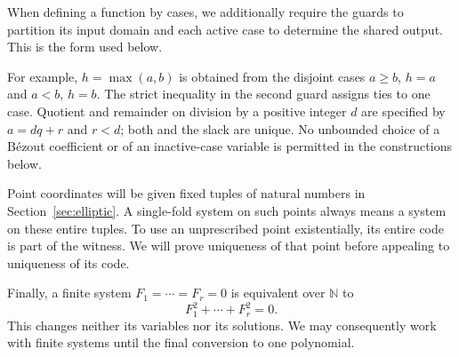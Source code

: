 \documentclass[11pt]{article}
\theoremstyle{definition}
\theoremstyle{remark}
\newcommand{\NN}{\mathbb N}
\begin{document}
When defining a function by cases, we additionally require the guards to
partition its input domain and each active case to determine the shared
output. This is the form used below.

For example, $h=\max(a,b)$ is obtained from the disjoint cases $a\ge b$, $h=a$
and $a<b$, $h=b$. The strict inequality in the second guard assigns ties to
one case. Quotient and remainder on division by a positive integer $d$ are
specified by $a=dq+r$ and $r<d$; both and the slack are unique.
No unbounded choice of a B\'ezout coefficient or of an inactive-case variable
is permitted in the constructions below.

Point coordinates will be given fixed tuples of natural numbers in
Section~\ref{sec:elliptic}. A single-fold system on such points always means a
system on these entire tuples. To use an unprescribed point existentially, its
entire code is part of the witness. We will prove uniqueness of that point
before appealing to uniqueness of its code.

Finally, a finite system $F_1=\cdots=F_r=0$ is equivalent over $\NN$ to
\begin{equation}\label{eq:squares}
 F_1^2+\cdots+F_r^2=0.
\end{equation}
This changes neither its variables nor its solutions. We may consequently
work with finite systems until the final conversion to one polynomial.





\appendix




\end{document}
